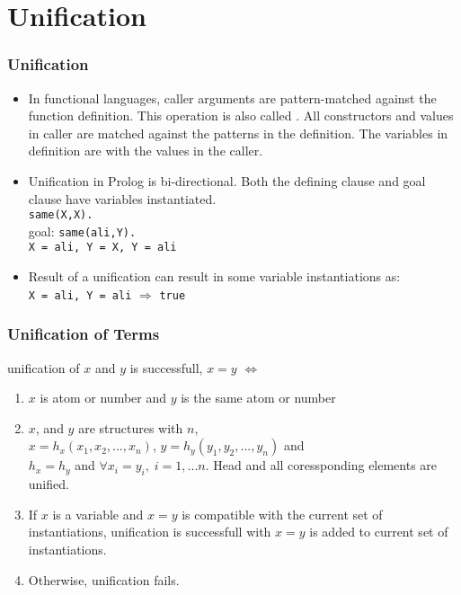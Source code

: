 \section{Unification}
\begin{frame}[fragile]
\frametitle{Unification}
\begin{itemize}
\item In functional languages, caller arguments are pattern-matched
against the function definition. This operation is also
called .  All constructors and values in caller
are matched against the patterns in the definition. The variables in
definition are  with the values in the caller.
\item Unification in Prolog is bi-directional. Both the defining clause and goal clause
have variables instantiated.\\
\lstinline!same(X,X).!\\
goal: \lstinline!same(ali,Y).!\\
\lstinline!X = ali, Y = X, Y = ali!
\item Result of a unification can result in some variable instantiations as:\\
\lstinline!X = ali, Y = ali! $\Rightarrow$ \lstinline!true!
\end{itemize}
\end{frame}

\begin{frame}
\frametitle{Unification of Terms}
unification of $x$ and $y$ is successfull, $x = y$ $\Leftrightarrow$ \\
\begin{enumerate}[<+->]
\item $x$ is atom or number and $y$ is the same atom or number
\item $x$, and $y$ are structures with  $n$,\\
 $x = h_x(x_1,x_2, ..., x_n)$, $y = h_y(y_1, y_2, ..., y_n)$ and\\
$h_x = h_y$ and $\forall x_i = y_i, \; i = 1, ... n$. Head and all coressponding
elements are unified.
\item If $x$ is a variable and $x = y$ is compatible with the current set of instantiations,
unification is successfull with $x = y$ is added to current set of instantiations.
\item Otherwise, unification fails.
\end{enumerate}
\end{frame}

